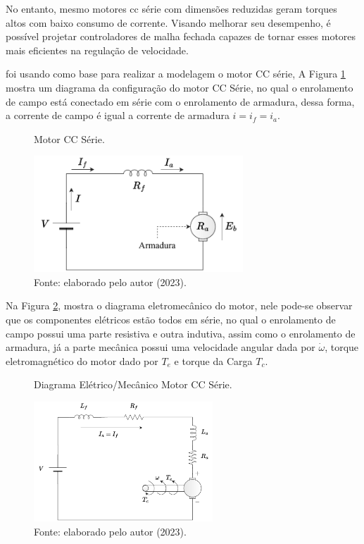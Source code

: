 No entanto, mesmo motores cc série com dimensões reduzidas geram torques altos com baixo consumo de corrente. Visando melhorar seu desempenho, é possível projetar controladores de malha fechada capazes de tornar esses motores mais eficientes na regulação de velocidade.

\cite{jesus} foi usando como base para realizar a modelagem o motor CC série, A Figura \ref{fig4:image_02} mostra um diagrama da configuração do motor CC Série, no qual o enrolamento de campo está conectado em série com o enrolamento de armadura, dessa forma, a  corrente de campo é igual a corrente de armadura $ i = i_f = i_a$.


\begin{figure}[!h]
	\centering
	\caption{Motor CC Série.}
	\includegraphics[width=0.7\textwidth]{Capitulos/4_desenvolvimento/4_figuras/esquema_motor_cc.pdf}
	\caption*{Fonte:  elaborado pelo autor (2023).}
	\label{fig4:image_02}
\end{figure}

Na Figura \ref{fig4:image_03}, mostra o diagrama eletromecânico do motor, nele pode-se observar que os componentes elétricos estão todos em série, no qual o enrolamento de campo possui uma parte resistiva e outra indutiva, assim como o enrolamento de armadura, já a parte mecânica possui uma velocidade angular dada por $\dot{\omega}$, torque eletromagnético do motor dado por $T_e$ e torque da Carga $T_c$.


\begin{figure}[!h]
	\centering
	\caption{Diagrama Elétrico/Mecânico Motor CC Série.}
	\includegraphics[width=0.6\textwidth]{Capitulos/4_desenvolvimento/4_figuras/diagrama_motor_cc.pdf}
	\caption*{Fonte: elaborado pelo autor (2023).}
	\label{fig4:image_03}
\end{figure}


